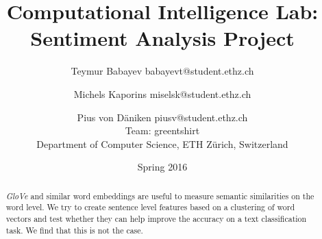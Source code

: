 \documentclass[a4paper, 11pt, notitlepage]{article}
\title{Computational Intelligence Lab:\\Sentiment Analysis Project}
\author{Teymur Babayev babayevt@student.ethz.ch \and Michels Kaporins miselsk@student.ethz.ch \and Pius von D\"aniken piusv@student.ethz.ch \\
Team: greentshirt \\
Department of Computer Science, ETH Z\"urich, Switzerland
}
\date{Spring 2016}
\begin{document}
\maketitle

\begin{abstract}
    \textit{GloVe} and similar word embeddings are useful to measure semantic
    similarities on the word level. We try to create sentence level features
    based on a clustering of word vectors and test whether they can help
    improve the accuracy on a text classification task. We find that this is not
    the case.
\end{abstract}









\end{document}
